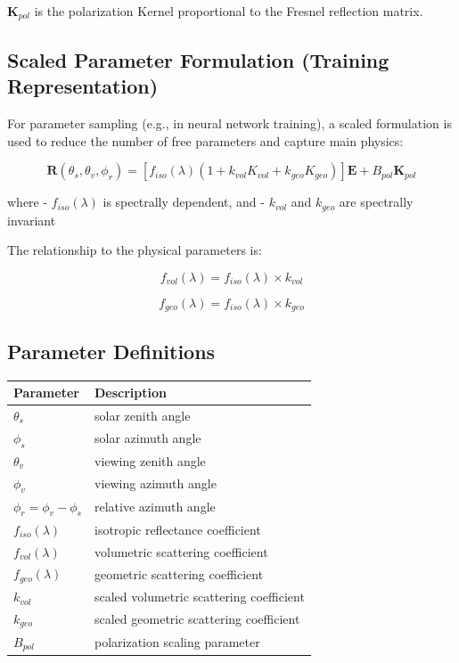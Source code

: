 \documentclass[
  11pt,
  letterpaper,
  DIV=11,
  numbers=noendperiod]{scrreprt}
\begin{document}
\(\mathbf{K}_{pol}\) is the polarization Kernel proportional to the
Fresnel reflection matrix.

\subsection{Scaled Parameter Formulation (Training
Representation)}\label{scaled-parameter-formulation-training-representation}

For parameter sampling (e.g., in neural network training), a scaled
formulation is used to reduce the number of free parameters and capture
main physics:

\[
\mathbf{R}(\theta_s,\theta_v,\phi_r) =
\left[
f_{iso}(\lambda)
\left(
1
+
k_{vol} K_{vol}
+
k_{geo} K_{geo}
\right)
\right]\mathbf{E}
+
B_{pol}\mathbf{K}_{pol}
\]

where - \(f_{iso}(\lambda)\) is spectrally dependent, and - \(k_{vol}\)
and \(k_{geo}\) are spectrally invariant

The relationship to the physical parameters is:

\[
f_{vol}(\lambda) = f_{iso}(\lambda) \times k_{vol}
\]

\[
f_{geo}(\lambda) = f_{iso}(\lambda) \times k_{geo}
\]

\subsection{Parameter Definitions}\label{parameter-definitions}

\begin{longtable}[]{@{}ll@{}}
\toprule\noalign{}
Parameter & Description \\
\midrule\noalign{}
\endhead
\bottomrule\noalign{}
\endlastfoot
\(\theta_s\) & solar zenith angle \\
\(\phi_s\) & solar azimuth angle \\
\(\theta_v\) & viewing zenith angle \\
\(\phi_v\) & viewing azimuth angle \\
\(\phi_r=\phi_v-\phi_s\) & relative azimuth angle \\
\(f_{iso}(\lambda)\) & isotropic reflectance coefficient \\
\(f_{vol}(\lambda)\) & volumetric scattering coefficient \\
\(f_{geo}(\lambda)\) & geometric scattering coefficient \\
\(k_{vol}\) & scaled volumetric scattering coefficient \\
\(k_{geo}\) & scaled geometric scattering coefficient \\
\(B_{pol}\) & polarization scaling parameter \\
\end{longtable}
\end{document}
